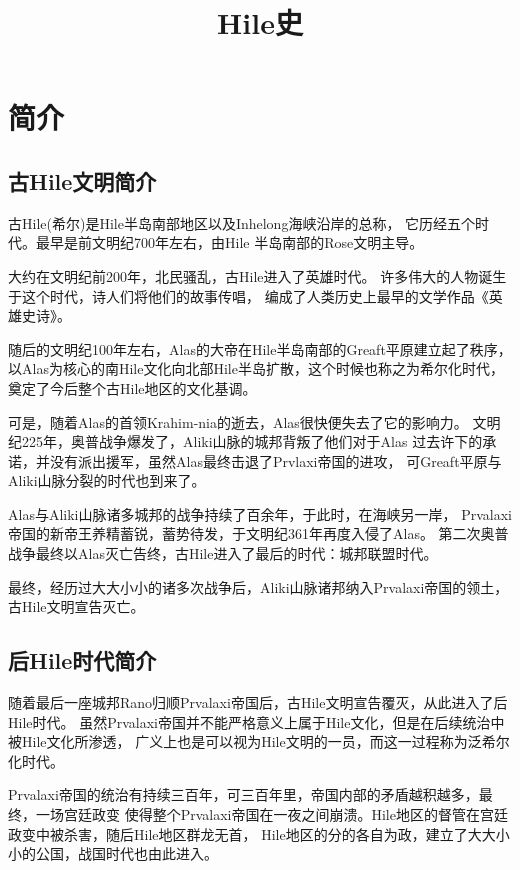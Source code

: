 \documentclass[UTF8,12pt]{ctexbook}
\title{\textbf{Hile史}}
\author{}
\date{}
\begin{document}
\maketitle
\tableofcontents
\chapter{简介}
    \section{古Hile文明简介}
        古Hile(希尔)是Hile半岛南部地区以及Inhelong海峡沿岸的总称，
        它历经五个时代。最早是前文明纪700年左右，由Hile
        半岛南部的Rose文明主导。

        大约在文明纪前200年，北民骚乱，古Hile进入了英雄时代。
        许多伟大的人物诞生于这个时代，诗人们将他们的故事传唱，
        编成了人类历史上最早的文学作品《英雄史诗》。

        随后的文明纪100年左右，Alas的大帝在Hile半岛南部的Greaft平原建立起了秩序，
        以Alas为核心的南Hile文化向北部Hile半岛扩散，这个时候也称之为希尔化时代，
        奠定了今后整个古Hile地区的文化基调。

        可是，随着Alas的首领Krahim-nia的逝去，Alas很快便失去了它的影响力。
        文明纪225年，奥普战争爆发了，Aliki山脉的城邦背叛了他们对于Alas
        过去许下的承诺，并没有派出援军，虽然Alas最终击退了Prvlaxi帝国的进攻，
        可Greaft平原与Aliki山脉分裂的时代也到来了。
        
        Alas与Aliki山脉诸多城邦的战争持续了百余年，于此时，在海峡另一岸，
        Prvalaxi帝国的新帝王养精蓄锐，蓄势待发，于文明纪361年再度入侵了Alas。
        第二次奥普战争最终以Alas灭亡告终，古Hile进入了最后的时代：城邦联盟时代。

        最终，经历过大大小小的诸多次战争后，Aliki山脉诸邦纳入Prvalaxi帝国的领土，
        古Hile文明宣告灭亡。
    \section{后Hile时代简介}
        随着最后一座城邦Rano归顺Prvalaxi帝国后，古Hile文明宣告覆灭，从此进入了后Hile时代。
        虽然Prvalaxi帝国并不能严格意义上属于Hile文化，但是在后续统治中被Hile文化所渗透，
        广义上也是可以视为Hile文明的一员，而这一过程称为泛希尔化时代。

        Prvalaxi帝国的统治有持续三百年，可三百年里，帝国内部的矛盾越积越多，最终，一场宫廷政变
        使得整个Prvalaxi帝国在一夜之间崩溃。Hile地区的督管在宫廷政变中被杀害，随后Hile地区群龙无首，
        Hile地区的分的各自为政，建立了大大小小的公国，战国时代也由此进入。
\end{document}
